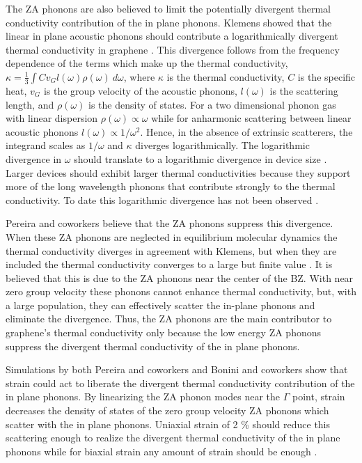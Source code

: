 The ZA phonons are also believed to limit the potentially divergent thermal conductivity contribution of the in plane phonons.
Klemens showed that the linear in plane acoustic phonons should contribute a logarithmically divergent thermal conductivity in graphene \cite{Klemens2001}.
This divergence follows from the frequency dependence of the terms which make up the thermal conductivity, $\kappa=\frac{1}{3} \int C v_G l(\omega) \rho(\omega) \ d\omega $, where $\kappa$ is the thermal conductivity, $C$ is the specific heat, $v_G$ is the group velocity of the acoustic phonons, $l(\omega)$ is the scattering length, and $\rho(\omega)$ is the density of states.
For a two dimensional phonon gas with linear dispersion $\rho(\omega) \propto \omega$ while for anharmonic scattering between linear acoustic phonons $l(\omega) \propto 1/\omega^2$.
Hence, in the absence of extrinsic scatterers, the integrand scales as $1/\omega$ and $\kappa$ diverges logarithmically.
The logarithmic divergence in $\omega$ should translate to a logarithmic divergence in device size \cite{Klemens2001}.
Larger devices should exhibit larger thermal conductivities because they support more of the long wavelength phonons that contribute strongly to the thermal conductivity.
To date this logarithmic divergence has not been observed \cite{Chen2011a}.

Pereira and coworkers believe that the ZA phonons suppress this divergence.
When these ZA phonons are neglected in equilibrium molecular dynamics the thermal conductivity diverges in agreement with Klemens, but when they are included the thermal conductivity converges to a large but finite value \cite{Pereira2013}.
It is believed that this is due to the ZA phonons near the center of the BZ.
With near zero group velocity these phonons cannot enhance thermal conductivity, but, with a large population, they can effectively scatter the in-plane phonons and eliminate the divergence.
Thus, the ZA phonons are the main contributor to graphene's thermal conductivity only because the low energy ZA phonons suppress the divergent thermal conductivity of the in plane phonons.

Simulations by both Pereira \cite{Pereira2013} and coworkers and Bonini and coworkers \cite{Bonini2012} show that strain could act to liberate the divergent thermal conductivity contribution of the in plane phonons.
By linearizing the ZA phonon modes near the $\Gamma$ point, strain decreases the density of states of the zero group velocity ZA phonons which scatter with the in plane phonons.
Uniaxial strain of 2 \% should reduce this scattering enough to realize the divergent thermal conductivity of the in plane phonons \cite{Pereira2013} while for biaxial strain any amount of strain should be enough \cite{Bonini2012}.

